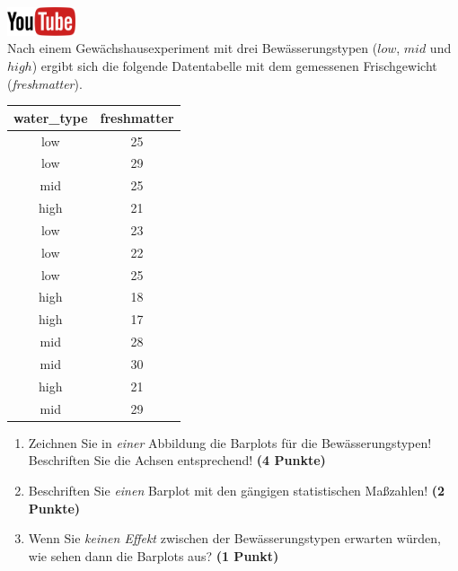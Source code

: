 \documentclass[a4paper, 10pt]{scrartcl}\usepackage[]{graphicx}\usepackage[]{xcolor}
\begin{document}
\hfill\href{https://youtu.be/vXnLttRL_VI}{\includegraphics[width =
  2cm]{img/youtube}}\\[1Ex]

Nach einem Gew{\"a}chshausexperiment mit drei Bew{\"a}sserungstypen ($low$, $mid$
und $high$) ergibt sich die folgende Datentabelle mit dem gemessenen
Frischgewicht (\textit{freshmatter}).

\begin{table}[!h]
\centering
\begin{tabular}{cc}
\toprule
water\_type & freshmatter\\
\midrule
low & 25\\
low & 29\\
mid & 25\\
high & 21\\
low & 23\\
\addlinespace
low & 22\\
low & 25\\
high & 18\\
high & 17\\
mid & 28\\
\addlinespace
mid & 30\\
high & 21\\
mid & 29\\
\bottomrule
\end{tabular}
\end{table}



\begin{enumerate}
\item Zeichnen Sie in \textit{einer} Abbildung die Barplots f{\"u}r die
  Bew{\"a}sserungstypen! Beschriften Sie die Achsen entsprechend!  \textbf{(4
    Punkte)}
\item Beschriften Sie \textit{einen} Barplot mit den g{\"a}ngigen
  statistischen Ma{\ss}zahlen! \textbf{(2 Punkte)}
\item Wenn Sie \textit{keinen Effekt} zwischen der Bew{\"a}sserungstypen
  erwarten w{\"u}rden, wie sehen dann die Barplots aus? \textbf{(1 Punkt)}
\end{enumerate} 
\clearpage
\end{document}
